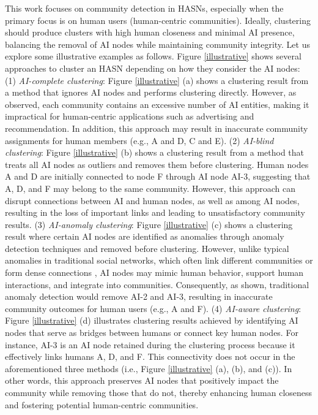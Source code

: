 This work focuses on community detection in HASNs, especially when the primary focus is on human users (human-centric communities). Ideally, clustering should produce clusters with high human closeness and minimal AI presence, balancing the removal of AI nodes while maintaining community integrity. Let us explore some illustrative examples as follows. Figure \ref{illustrative} shows several approaches to cluster an HASN depending on how they consider the AI nodes: (1) \textit{AI-complete clustering}: Figure \ref{illustrative} (a) shows a clustering result from a method that ignores AI nodes and performs clustering directly. However, as observed, each community contains an excessive number of AI entities, making it impractical for human-centric applications such as advertising and recommendation. In addition, this approach may result in inaccurate community assignments for human members (e.g., A and D, C and E). 
(2) \textit{AI-blind clustering}: Figure \ref{illustrative} (b) shows a clustering result from a method that treats all AI nodes as outliers and removes them before clustering. Human nodes A and D are initially connected to node F through AI node AI-3, suggesting that A, D, and F may belong to the same community. However, this approach can disrupt connections between AI and human nodes, as well as among AI nodes, resulting in the loss of important links and leading to unsatisfactory community results. (3) \textit{AI-anomaly clustering}: Figure \ref{illustrative} (c) shows a clustering result where certain AI nodes are identified as anomalies through anomaly detection techniques and removed before clustering. However, unlike typical anomalies in traditional social networks, which often link different communities or form dense connections \cite{ma2021comprehensive}\cite{lamichhane2024anomaly}, AI nodes may mimic human behavior, support human interactions, and integrate into communities. Consequently, as shown, traditional anomaly detection would remove AI-2 and AI-3, resulting in inaccurate community outcomes for human users (e.g., A and F). (4) \textit{AI-aware clustering}: Figure \ref{illustrative} (d) illustrates clustering results achieved by identifying AI nodes that serve as bridges between humans or connect key human nodes. For instance, AI-3 is an AI node retained during the clustering process because it effectively links humans A, D, and F. This connectivity does not occur in the aforementioned three methods (i.e., Figure \ref{illustrative} (a), (b), and (c)). In other words, this approach preserves AI nodes that positively impact the community while removing those that do not, thereby enhancing human closeness and fostering potential human-centric communities.



